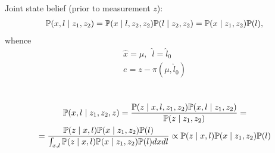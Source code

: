\documentclass[a4paper]{scrreprt}
\begin{document}


Joint state belief (prior to measurement $z$): 
\begin{gather}
	\mathbb{P}({x, l \mid z_1, z_2}) = \mathbb{P}({x\mid l, z_2, z_2})\mathbb{P}({l\mid z_2, z_2}) = 
	\mathbb{P}({x\mid z_1, z_2})\mathbb{P}({l}), 
\end{gather}
whence
\begin{gather}
	\hat{x} = \mu, \enspace \hat{l} = \hat{l}_0 \\
	e = z-\pi(\mu, \hat{l}_0)
\end{gather}

\section{}
\begin{gather}
	\mathbb{P}({x,l\mid z_1, z_2, z}) = \frac{\mathbb{P}({z\mid x, l, z_1, z_2}) \mathbb{P}({x, 
	l\mid z_1, z_2})}{\mathbb{P}({z\mid z_1, z_2})} = \\
	= \frac{\mathbb{P}({z\mid x, l})\mathbb{P}({x\mid z_1, 
	z_2})\mathbb{P}({l})}{\int_{x,l}\mathbb{P}({z\mid 
	x, l})\mathbb{P}({x\mid z_1, z_2})\mathbb{P}({l})dx dl} 
	\propto \mathbb{P}({z\mid x, l})\mathbb{P}({x\mid z_1, z_2})\mathbb{P}({l})
\end{gather}
\end{document}
